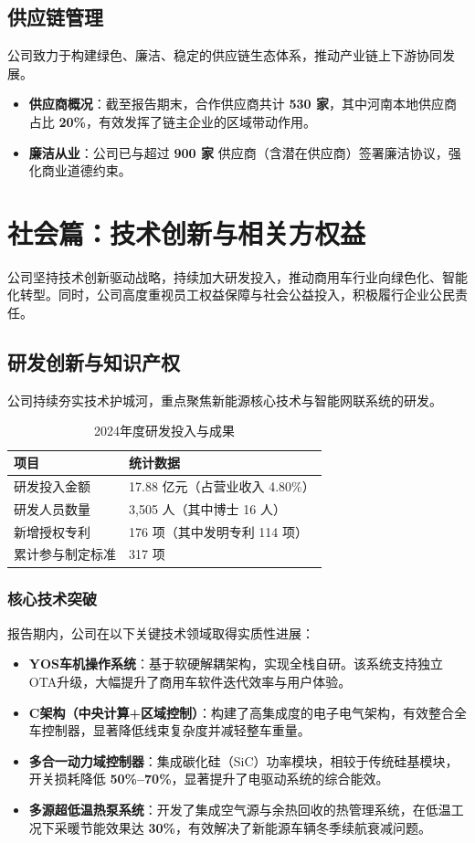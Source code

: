 \documentclass[a4paper,12pt]{article}
\begin{document}
\subsection{供应链管理}
公司致力于构建绿色、廉洁、稳定的供应链生态体系，推动产业链上下游协同发展。
\begin{itemize}
    \item \textbf{供应商概况}：截至报告期末，合作供应商共计 \textbf{530 家}，其中河南本地供应商占比 \textbf{20\%}，有效发挥了链主企业的区域带动作用。
    \item \textbf{廉洁从业}：公司已与超过 \textbf{900 家} 供应商（含潜在供应商）签署廉洁协议，强化商业道德约束。
\end{itemize}

\section{社会篇：技术创新与相关方权益}

公司坚持技术创新驱动战略，持续加大研发投入，推动商用车行业向绿色化、智能化转型。同时，公司高度重视员工权益保障与社会公益投入，积极履行企业公民责任。

\subsection{研发创新与知识产权}
公司持续夯实技术护城河，重点聚焦新能源核心技术与智能网联系统的研发。

\begin{table}[h]
\centering
\caption{2024年度研发投入与成果}
\renewcommand{\arraystretch}{1.3}
\begin{tabular}{l l}
\toprule
\textbf{项目} & \textbf{统计数据} \\
\midrule
研发投入金额 & 17.88 亿元（占营业收入 4.80\%） \\
研发人员数量 & 3,505 人（其中博士 16 人） \\
新增授权专利 & 176 项（其中发明专利 114 项） \\
累计参与制定标准 & 317 项 \\
\bottomrule
\end{tabular}
\end{table}

\subsubsection{核心技术突破}
报告期内，公司在以下关键技术领域取得实质性进展：
\begin{itemize}
    \item \textbf{YOS车机操作系统}：基于软硬解耦架构，实现全栈自研。该系统支持独立OTA升级，大幅提升了商用车软件迭代效率与用户体验。
    \item \textbf{C架构（中央计算+区域控制）}：构建了高集成度的电子电气架构，有效整合全车控制器，显著降低线束复杂度并减轻整车重量。
    \item \textbf{多合一动力域控制器}：集成碳化硅（SiC）功率模块，相较于传统硅基模块，开关损耗降低 \textbf{50\%--70\%}，显著提升了电驱动系统的综合能效。
    \item \textbf{多源超低温热泵系统}：开发了集成空气源与余热回收的热管理系统，在低温工况下采暖节能效果达 \textbf{30\%}，有效解决了新能源车辆冬季续航衰减问题。
\end{itemize}
\end{document}
